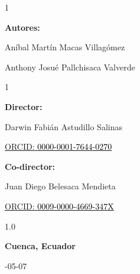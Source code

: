 \begin{titlepage}
\vspace*{0.4cm}

\begin{spacing}{1}
{\fontsize{11}{14}\selectfont \textbf{Autores:}\par}
{\fontsize{11}{14}\selectfont Aníbal Martín Macas Villagómez\par}
{\fontsize{11}{14}\selectfont Anthony Josué Pallchisaca Valverde\par}
\end{spacing}

\vspace*{0.9cm}

\begin{spacing}{1}
    
{\fontsize{11}{14}\selectfont \textbf{Director:}\par}
{\fontsize{11}{14}\selectfont Darwin Fabián Astudillo Salinas\par}
{\fontsize{11}{14}\selectfont \href{https://orcid.org/0000-0001-7644-0270}{\textcolor{orcidlogocol}{ORCID:} \textcolor{black}{0000-0001-7644-0270}}\par}
{\fontsize{11}{14}\selectfont \textbf{Co-director:}\par}
{\fontsize{11}{14}\selectfont Juan Diego Belesaca Mendieta\par}
{\fontsize{11}{14}\selectfont \href{https://orcid.org/0009-0000-4669-347X}{\textcolor{orcidlogocol}{ORCID:} \textcolor{black}{0009-0000-4669-347X}}\par}

\end{spacing}

\vfill

\begin{center}
\begin{spacing}{1.0}
    {\fontsize{11}{14}\selectfont \textbf{Cuenca, Ecuador}\par}
    \vspace*{2mm}
    {\fontsize{11}{14}-05-07\par}
\end{spacing}
\end{center}

\end{titlepage}
\clearpage